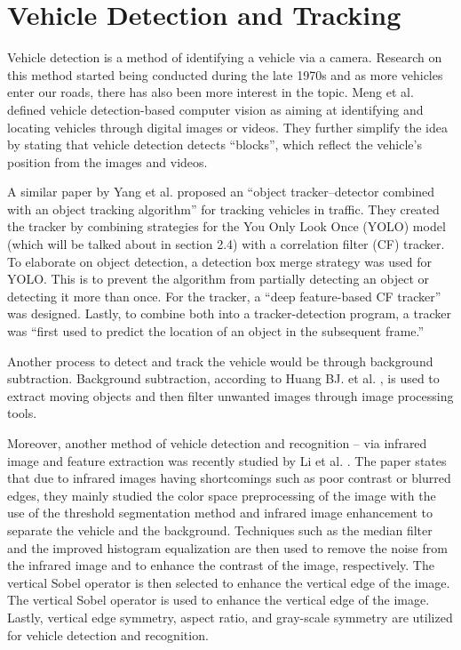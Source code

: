 \section{Vehicle Detection and Tracking}

	Vehicle detection is a method of identifying a vehicle via a camera. Research on this method started being conducted during the late 1970s \cite{NathDeb2012} and as more vehicles enter our roads, there has also been more interest in the topic. Meng et al. \citeyear{Meng_2020} defined vehicle detection-based computer vision as aiming at identifying and locating vehicles through digital images or videos. They further simplify the idea by stating that vehicle detection detects “blocks”, which reflect the vehicle’s position from the images and videos.

	A similar paper by Yang et al. \citeyear{yang_2020} proposed an “object tracker–detector combined with an object tracking algorithm” for tracking vehicles in traffic. They created the tracker by combining strategies for the You Only Look Once (YOLO) model (which will be talked about in section 2.4) with a correlation filter (CF) tracker. To elaborate on object detection, a detection box merge strategy was used for YOLO. This is to prevent the algorithm from partially detecting an object or detecting it more than once. For the tracker, a “deep feature-based CF tracker” was designed. Lastly, to combine both into a tracker-detection program, a tracker was “first used to predict the location of an object in the subsequent frame.”

	Another process to detect and track the vehicle would be through background subtraction. Background subtraction, according to Huang BJ. et al. \citeyear{Huang_2017}, is used to extract moving objects and then filter unwanted images through image processing tools. 
	
	Moreover, another method of vehicle detection and recognition – via infrared image and feature extraction was recently studied by Li et al. \citeyear{li_2022}.
	The paper states that due to infrared images having shortcomings such as poor contrast or blurred edges, they mainly studied the color space preprocessing of the image with the use of the threshold segmentation method and infrared image enhancement to separate the vehicle and the background. Techniques such as the median filter and the improved histogram equalization are then used to remove the noise from the infrared image and to enhance the contrast of the image, respectively. The vertical Sobel operator is then selected to enhance the vertical edge of the image. The vertical Sobel operator is used to enhance the vertical edge of the image. Lastly, vertical edge symmetry, aspect ratio, and gray-scale symmetry are utilized for vehicle detection and recognition.


